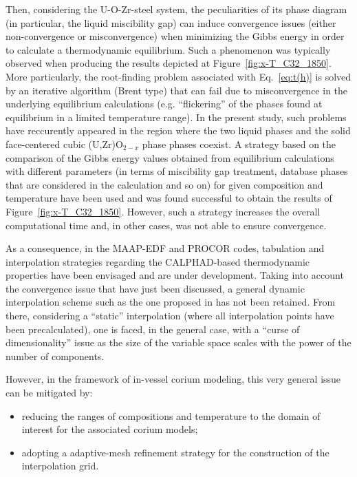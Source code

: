 \documentclass[11pt]{article}\usepackage{geometry} \geometry{letterpaper, margin=25.4mm}
\newcommand{\Eq}[1]{Eq.~\ref{eq:#1}}
\newcommand{\Fig}[1]{Figure~\ref{fig:#1}}
\begin{document}
Then, considering the U-O-Zr-steel system, the peculiarities of its phase diagram (in particular, the liquid miscibility gap) can induce convergence issues (either non-convergence or misconvergence) when minimizing the Gibbs energy in order to calculate a thermodynamic equilibrium. Such a phenomenon was typically observed when producing the results depicted at \Fig{x-T_C32_1850}. More particularly, the root-finding problem associated with \Eq{t(h)} is solved by an iterative algorithm (Brent type) that can fail due to misconvergence in the underlying equilibrium calculations (e.g. ``flickering'' of the phases found at equilibrium in a limited temperature range). In the present study, such problems have reccurently appeared in the region where the two liquid phases and the solid face-centered cubic (U,Zr)O$_{2-x}$ phase phases coexist. A strategy based on the comparison of the Gibbs energy values obtained from equilibrium calculations with different parameters (in terms of miscibility gap treatment, database phases that are considered in the calculation and so on) for given composition and temperature have been used and was found successful to obtain the results of \Fig{x-T_C32_1850}. However, such a strategy increases the overall computational time and, in other cases, was not able to ensure convergence.

As a consequence, in the MAAP-EDF and PROCOR codes, tabulation and interpolation strategies regarding the CALPHAD-based thermodynamic properties have been envisaged and are under development. Taking into account the convergence issue that have just been discussed, a general dynamic interpolation scheme such as the one proposed in \cite{Larsson2015} has not been retained. From there, considering a ``static'' interpolation (where all interpolation points have been precalculated), one is faced, in the general case,  with a ``curse of dimensionality'' issue as the size of the variable space scales with the power of the number of components. 

However, in the framework of in-vessel corium modeling, this very general issue can be mitigated by:
\begin{itemize}
 \item reducing the ranges of compositions and temperature to the domain of interest for the associated corium models;
 \item adopting a adaptive-mesh refinement strategy for the construction of the interpolation grid.
\end{itemize}
\end{document}
